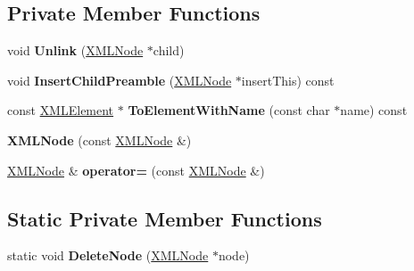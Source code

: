 \subsection*{Private Member Functions}
\begin{DoxyCompactItemize}
\item 
void {\bfseries Unlink} (\hyperlink{classtinyxml2_1_1XMLNode}{X\+M\+L\+Node} $\ast$child)\hypertarget{classtinyxml2_1_1XMLNode_a9546e242b6a4f232415befb1cfe0fdd4}{}\label{classtinyxml2_1_1XMLNode_a9546e242b6a4f232415befb1cfe0fdd4}

\item 
void {\bfseries Insert\+Child\+Preamble} (\hyperlink{classtinyxml2_1_1XMLNode}{X\+M\+L\+Node} $\ast$insert\+This) const \hypertarget{classtinyxml2_1_1XMLNode_a7d048822eae74efbfc5d50ff023aef88}{}\label{classtinyxml2_1_1XMLNode_a7d048822eae74efbfc5d50ff023aef88}

\item 
const \hyperlink{classtinyxml2_1_1XMLElement}{X\+M\+L\+Element} $\ast$ {\bfseries To\+Element\+With\+Name} (const char $\ast$name) const \hypertarget{classtinyxml2_1_1XMLNode_a47eac892557a8de5950ad5b8037bc361}{}\label{classtinyxml2_1_1XMLNode_a47eac892557a8de5950ad5b8037bc361}

\item 
{\bfseries X\+M\+L\+Node} (const \hyperlink{classtinyxml2_1_1XMLNode}{X\+M\+L\+Node} \&)\hypertarget{classtinyxml2_1_1XMLNode_a78be01384518a969da905548f318d75b}{}\label{classtinyxml2_1_1XMLNode_a78be01384518a969da905548f318d75b}

\item 
\hyperlink{classtinyxml2_1_1XMLNode}{X\+M\+L\+Node} \& {\bfseries operator=} (const \hyperlink{classtinyxml2_1_1XMLNode}{X\+M\+L\+Node} \&)\hypertarget{classtinyxml2_1_1XMLNode_ade79231d908e1f21862819e00e56ab6e}{}\label{classtinyxml2_1_1XMLNode_ade79231d908e1f21862819e00e56ab6e}

\end{DoxyCompactItemize}
\subsection*{Static Private Member Functions}
\begin{DoxyCompactItemize}
\item 
static void {\bfseries Delete\+Node} (\hyperlink{classtinyxml2_1_1XMLNode}{X\+M\+L\+Node} $\ast$node)\hypertarget{classtinyxml2_1_1XMLNode_ab0b21951f2343534c5c67f23dffdc7e6}{}\label{classtinyxml2_1_1XMLNode_ab0b21951f2343534c5c67f23dffdc7e6}

\end{DoxyCompactItemize}
